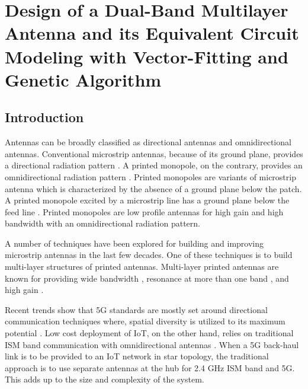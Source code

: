 \chapter{Design of a Dual-Band Multilayer Antenna and its Equivalent Circuit Modeling with Vector-Fitting and Genetic Algorithm}
\label{chap:chap4}
\section{Introduction}\label{c4sec:intro}
Antennas can be broadly classified as directional antennas and omnidirectional antennas. Conventional microstrip antennas, because of its ground plane, provides a directional radiation pattern \cite{handbook}. A printed monopole, on the contrary, provides an omnidirectional radiation pattern \cite{pma_stripline, pma_dualband}. Printed monopoles are variants of microstrip antenna which is characterized by the absence of a ground plane below the patch. A printed monopole excited by a microstrip line has a ground plane below the feed line \cite{pma_stripline}. Printed monopoles are low profile antennas for high gain and high bandwidth with an omnidirectional radiation pattern\cite{PMA01}.

A number of techniques have been explored for building and improving microstrip antennas in the last few decades. One of these techniques is to build multi-layer structures of printed antennas. Multi-layer printed antennas are known for providing wide bandwidth \cite{ML_WideBand01}, resonance at more than one band \cite{ML_DualBand01, ML_DualBand02}, and high gain \cite{ML_high_gain_parasitic_slot}.

Recent trends show that 5G standards are mostly set around directional communication techniques where, spatial diversity is utilized to its maximum potential \cite{5G_surv1, 5G_surv2}. Low cost deployment of IoT, on the other hand, relies on traditional ISM band communication with omnidirectional antennas \cite{iot-ant1,iot-ant2,iot-ant3}. When a 5G back-haul link is to be provided to an IoT network in star topology, the traditional approach is to use separate antennas at the hub for 2.4 GHz ISM band and 5G. This adds up to the size and complexity of the system.

